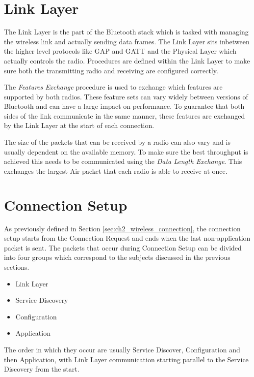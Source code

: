 \section{Link Layer}
The Link Layer is the part of the Bluetooth stack which is tasked with managing the wireless link and actually sending data frames. The Link Layer sits inbetween the higher level protocols like GAP and GATT and the Physical Layer which actually controls the radio.
Procedures are defined within the Link Layer to make sure both the transmitting radio and receiving are configured correctly.

The \textit{Features Exchange} procedure is used to exchange which features are supported by both radios. These feature sets can vary widely between versions of Bluetooth and can have a large impact on performance. To guarantee that both sides of the link communicate in the same manner, these features are exchanged by the Link Layer at the start of each connection.

The size of the packets that can be received by a radio can also vary and is usually dependent on the available memory. To make sure the best throughput is achieved this needs to be communicated using the \textit{Data Length Exchange}. This exchanges the largest Air packet that each radio is able to receive at once.

\section{Connection Setup}
As previously defined in Section \ref{sec:ch2_wireless_connection}, the connection setup starts from the Connection Request and ends when the last non-application packet is sent. The packets that occur during Connection Setup can be divided into four groups which correspond to the subjects discussed in the previous sections.
\begin{itemize}
    \item Link Layer
    \item Service Discovery
    \item Configuration
    \item Application
\end{itemize} 
The order in which they occur are usually Service Discover, Configuration and then Application, with Link Layer communication starting parallel to the Service Discovery from the start.
